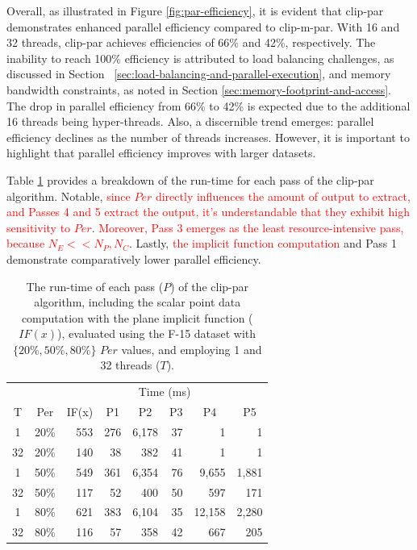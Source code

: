 \documentclass{egpubl}
\newcommand*{\fix}[1]{\textcolor{red}{#1}}
\begin{document}
Overall, as illustrated in Figure \ref{fig:par-efficiency}, it is evident that clip-par demonstrates enhanced parallel efficiency compared to clip-m-par. With 16 and 32 threads, clip-par achieves efficiencies of 66\% and 42\%, respectively. The inability to reach 100\% efficiency is attributed to load balancing challenges, as discussed in Section ~\ref{sec:load-balancing-and-parallel-execution}, and memory bandwidth constraints, as noted in Section \ref{sec:memory-footprint-and-access}. The drop in parallel efficiency from 66\% to 42\% is expected due to the additional 16 threads being hyper-threads. Also, a discernible trend emerges: parallel efficiency declines as the number of threads increases. However, it is important to highlight that parallel efficiency improves with larger datasets.

Table \ref{tab:pass-time} provides a breakdown of the run-time for each pass of the clip-par algorithm. Notable, \fix{since $Per$ directly influences the amount of output to extract, and Passes 4 and 5 extract the output, it's understandable that they exhibit high sensitivity to $Per$}. \fix{Moreover, Pass 3 emerges as the least resource-intensive pass, because $N_E << N_P, N_C$}. Lastly, \fix{the implicit function computation} and Pass 1 demonstrate comparatively lower parallel efficiency.

\begin{table}[h]
\centering
\caption{The run-time of each pass ($P$) of the clip-par algorithm, including the scalar point data computation with the plane implicit function ($IF(x)$),  evaluated using the F-15 dataset with  $\{20\%, 50\%, 80\%\}$ $Per$ values, and employing 1 and 32 threads ($T$).}
\label{tab:pass-time}
\begin{tabular}{cc@{\quad}rrrrrr}
\toprule
\multicolumn{2}{l}{} & \multicolumn{6}{c}{Time (ms)}                                                                                                                                        \\
T  & Per & \multicolumn{1}{c}{IF(x)} & \multicolumn{1}{c}{P1} & \multicolumn{1}{c}{P2} & \multicolumn{1}{c}{P3} & \multicolumn{1}{c}{P4} & \multicolumn{1}{c}{P5} \\
\midrule
1  & 20\% & 553   & 276 & 6,178 & 37 & 1      & 1     \\
32 & 20\% & 140   & 38  & 382   & 41 & 1      & 1     \\
1  & 50\% & 549   & 361 & 6,354 & 76 & 9,655  & 1,881 \\
32 & 50\% & 117   & 52  & 400   & 50 & 597    & 171   \\
1  & 80\% & 621   & 383 & 6,104 & 35 & 12,158 & 2,280 \\
32 & 80\% & 116   & 57  & 358   & 42 & 667    & 205   \\
\bottomrule
\end{tabular}
\end{table}
\end{document}
